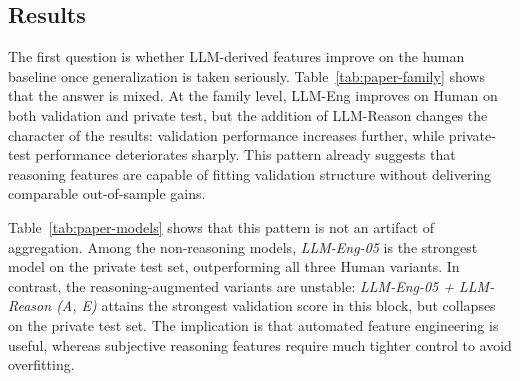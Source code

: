 \documentclass{article}
\theoremstyle{plain}
\theoremstyle{definition}
\theoremstyle{remark}
\begin{document}
\subsection{Results}
The first question is whether LLM-derived features improve on the human baseline once generalization is taken seriously. Table~\ref{tab:paper-family} shows that the answer is mixed. At the family level, LLM-Eng improves on Human on both validation and private test, but the addition of LLM-Reason changes the character of the results: validation performance increases further, while private-test performance deteriorates sharply. This pattern already suggests that reasoning features are capable of fitting validation structure without delivering comparable out-of-sample gains.

\begin{table}[t]
\centering
\small
{}
\caption{Part 1 family-level validation vs private-test.}
\label{tab:paper-family}
\end{table}

Table~\ref{tab:paper-models} shows that this pattern is not an artifact of aggregation. Among the non-reasoning models, \textit{LLM-Eng-05} is the strongest model on the private test set, outperforming all three Human variants. In contrast, the reasoning-augmented variants are unstable: \textit{LLM-Eng-05 + LLM-Reason (A, E)} attains the strongest validation score in this block, but collapses on the private test set. The implication is that automated feature engineering is useful, whereas subjective reasoning features require much tighter control to avoid overfitting.
\end{document}
